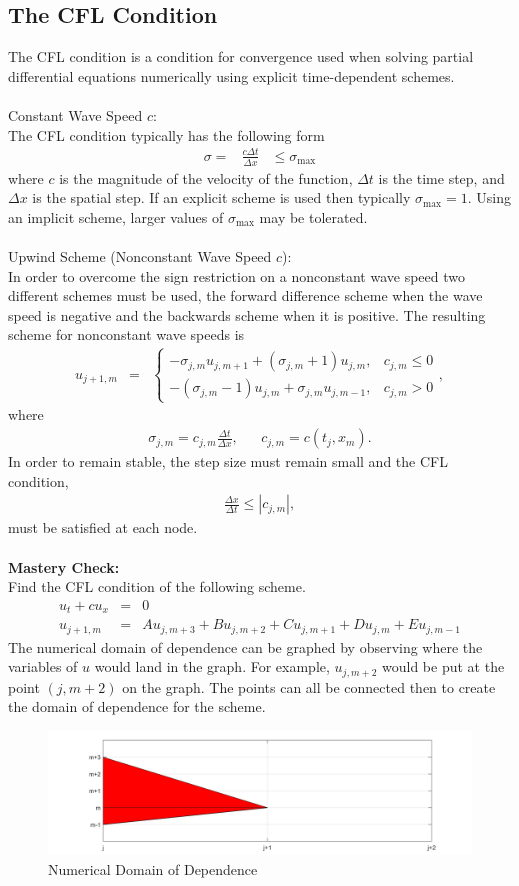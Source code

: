 \documentclass{article}
\newcommand{\bea}{\begin{eqnarray*}}
\newcommand{\eea}{\end{eqnarray*}}
\begin{document}
 \subsection{The CFL Condition}
The CFL condition is a condition for convergence used when solving partial differential equations numerically using explicit time-dependent schemes.\\\\
Constant Wave Speed $c$:\\
The CFL condition typically has the following form
\bea
\sigma = &\frac{c\Delta t}{\Delta x}& \leq \sigma_{\text{max}}
\eea
where $c$ is the magnitude of the velocity of the function, $\Delta t$ is the time step, and $\Delta x$ is the spatial step. If an explicit scheme is used then typically $\sigma_{\text{max}} = 1$. Using an implicit scheme, larger values of $\sigma_{\text{max}}$ may be tolerated.\\\\
Upwind Scheme (Nonconstant Wave Speed $c$):\\
In order to overcome the sign restriction on a nonconstant wave speed two different schemes must be used, the forward difference scheme when the wave speed is negative and the backwards scheme when it is positive. The resulting scheme for nonconstant wave speeds is
\bea
u_{j+1,m} &=&\begin{cases}
-\sigma_{j,m}u_{j,m+1}+(\sigma_{j,m}+1)u_{j,m}, & c_{j,m} \leq 0\\
-(\sigma_{j,m}-1)u_{j,m}+\sigma_{j,m}u_{j,m-1}, & c_{j,m} > 0
\end{cases},
\eea
where
\bea
\sigma_{j,m} = c_{j,m}\frac{\Delta t}{\Delta x}, && c_{j,m} = c(t_j,x_m).
\eea
In order to remain stable, the step size must remain small and the CFL condition,
\bea
\frac{\Delta x}{\Delta t} \leq |c_{j,m}|,
\eea
 must be satisfied at each node.\\\\
\textbf{Mastery Check:}\\
Find the CFL condition of the following scheme.
\bea
u_t+cu_x &=& 0\\
u_{j+1,m} &=& Au_{j,m+3} + Bu_{j,m+2} + Cu_{j,m+1} + Du_{j,m} + Eu_{j,m-1}
\eea
The numerical domain of dependence can be graphed by observing where the variables of $u$ would land in the graph. For example, $u_{j,m+2}$ would be put at the point $(j,m+2)$ on the graph. The points can all be connected then to create the domain of dependence for the scheme.
\begin{figure} [H]
\begin{center}
\includegraphics[width = 6.5 in, clip]{DomainOfDependence}
\caption{Numerical Domain of Dependence \label{fig:domain}}
\end{center}
\end{figure}
\end{document}
